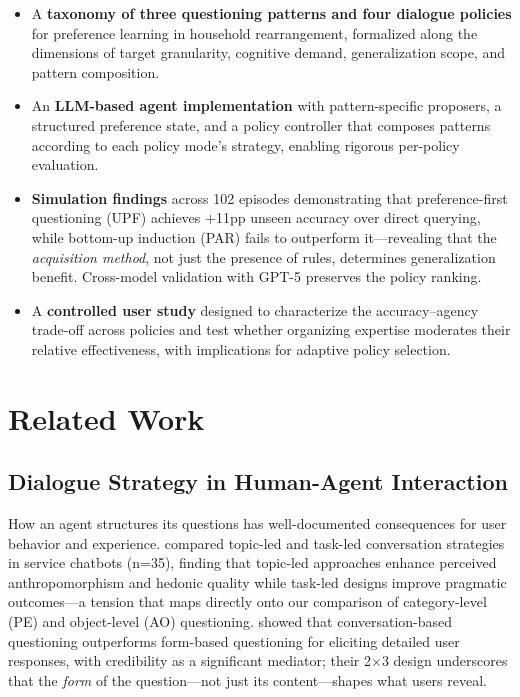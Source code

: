\documentclass[a4paper,fleqn]{cas-sc}
\begin{document}
\begin{itemize}[leftmargin=*]
    \item A \textbf{taxonomy of three questioning patterns and four dialogue policies} for preference learning in household rearrangement, formalized along the dimensions of target granularity, cognitive demand, generalization scope, and pattern composition.
    \item An \textbf{LLM-based agent implementation} with pattern-specific proposers, a structured preference state, and a policy controller that composes patterns according to each policy mode's strategy, enabling rigorous per-policy evaluation.
    \item \textbf{Simulation findings} across 102 episodes demonstrating that preference-first questioning (UPF) achieves +11pp unseen accuracy over direct querying, while bottom-up induction (PAR) fails to outperform it---revealing that the \emph{acquisition method}, not just the presence of rules, determines generalization benefit. Cross-model validation with GPT-5 preserves the policy ranking.
    \item A \textbf{controlled user study} designed to characterize the accuracy--agency trade-off across policies and test whether organizing expertise moderates their relative effectiveness, with implications for adaptive policy selection.
\end{itemize}


\section{Related Work}\label{sec:related}

\subsection{Dialogue Strategy in Human-Agent Interaction}

How an agent structures its questions has well-documented consequences for user behavior and experience. \citet{haugeland2022understanding} compared topic-led and task-led conversation strategies in service chatbots (n=35), finding that topic-led approaches enhance perceived anthropomorphism and hedonic quality while task-led designs improve pragmatic outcomes---a tension that maps directly onto our comparison of category-level (PE) and object-level (AO) questioning. \citet{jin2024way} showed that conversation-based questioning outperforms form-based questioning for eliciting detailed user responses, with credibility as a significant mediator; their 2$\times$3 design underscores that the \emph{form} of the question---not just its content---shapes what users reveal.
\end{document}
